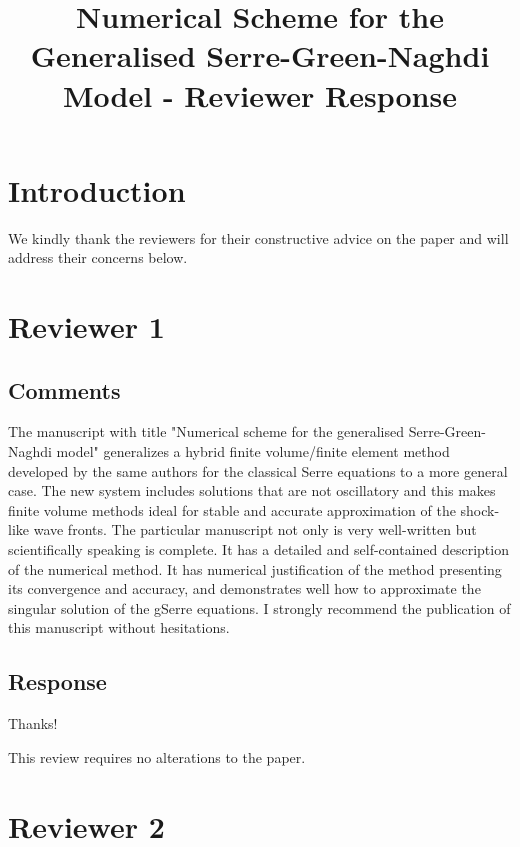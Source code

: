 \documentclass[10pt]{article}
\begin{document}
	\title{Numerical Scheme for the Generalised Serre-Green-Naghdi Model - Reviewer Response}
	
	\maketitle

\section{Introduction}

We kindly thank the reviewers for their constructive advice on the paper and will address their concerns below.
	
\section{Reviewer 1}
\subsection{Comments}
The manuscript with title "Numerical scheme for the generalised Serre-Green-Naghdi model" generalizes a hybrid finite volume/finite element method developed by the same authors for the classical Serre equations to a more general case. The new system includes solutions that are not oscillatory and this makes finite volume methods ideal for stable and accurate approximation of the shock-like wave fronts. The particular manuscript not only is very well-written but scientifically speaking is complete. It has a detailed and self-contained description of the numerical method. It has numerical justification of the method presenting its convergence and accuracy, and demonstrates well how to approximate the singular solution of the gSerre equations.
I strongly recommend the publication of this manuscript without hesitations.

\subsection{Response}
Thanks!

This review requires no alterations to the paper.


\section{Reviewer 2}
\end{document}
